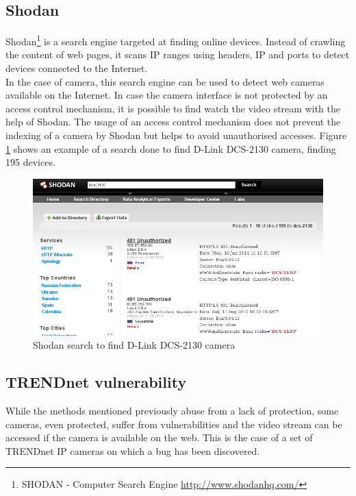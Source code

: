 \subsection{Shodan}
\label{sec:shodanhq}

Shodan\footnote{SHODAN - Computer Search Engine \url{http://www.shodanhq.com/}} is a search engine targeted at finding online devices.
Instead of crawling the content of web pages, it scans IP ranges using headers, IP and ports to detect devices connected to the Internet.\\

In the case of camera, this search engine can be used to detect web cameras available on the Internet.
In case the camera interface is not protected by an access control mechanism, it is possible to find watch the video stream with the help of Shodan.
The usage of an access control mechanism does not prevent the indexing of a camera by Shodan but helps to avoid unauthorised accesses.
Figure \ref{fig:shodan-dcs} shows an example of a search done to find D-Link DCS-2130 camera, finding 195 devices.

\begin{figure}[h]
  \centering
  \includegraphics[width=\textwidth]{images/shodan-dcs.png}
  \caption{Shodan search to find D-Link DCS-2130 camera}
  \label{fig:shodan-dcs}
\end{figure}

\subsection{TRENDnet vulnerability}
\label{sec:trendnet-hack}

While the methods mentioned previously abuse from a lack of protection, some cameras, even protected, suffer from vulnerabilities and the video stream can be accessed if the camera is available on the web.
This is the case of a set of TRENDnet IP cameras on which a bug has been discovered.\\

